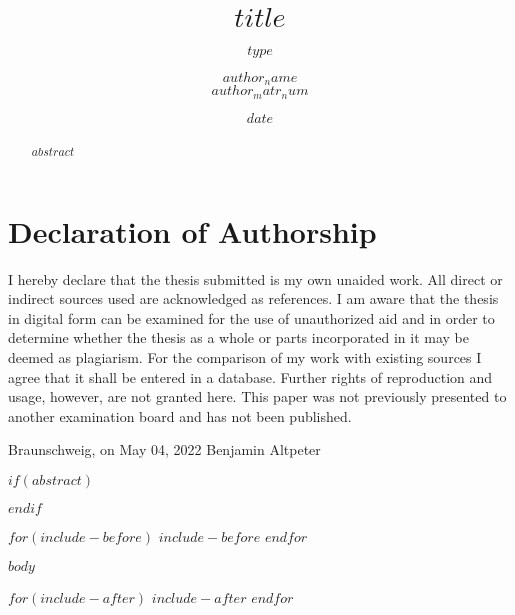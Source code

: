 \documentclass[
  a4paper,
  10pt,
  bibliography=totoc, %
  oneside,
  rgb,
  abstract=on,
  lnum, %
  smallchapters
]{tubsreprt}
\title{$title$}
\subtitle{$type$}
\author{$author_name$\\ \vspace{1cm} \large{$author_matr_num$}}
\date{$date$}
\renewcommand{\href}[2]{\originalHref{#1}{#2}\footnote{\url{#1}}}
\begin{document}
\maketitle

\chapter*{Declaration of Authorship}

\vspace{3cm}

I hereby declare that the thesis submitted is my own unaided work. All direct or indirect
sources used are acknowledged as references.
I am aware that the thesis in digital form can be examined for the use of unauthorized
aid and in order to determine whether the thesis as a whole or parts incorporated
in it may be deemed as plagiarism. For the comparison of my work with existing
sources I agree that it shall be entered in a database. Further rights
of reproduction and usage, however, are not granted here.
This paper was not previously presented to another examination board and has not
been published.
\vspace{3cm}

\hspace{2cm}Braunschweig, on May 04, 2022 \hfill Benjamin Altpeter\hspace{2cm}

\tableofcontents

$if(abstract)$
\begin{abstract}
    $abstract$

    \vspace*{\fill}
    \renewcommand{\href}[2]{\originalHref{#1}{#2}}
    \doclicenseThis
    \renewcommand{\href}[2]{\originalHref{#1}{#2}\footnote{\url{#1}}}
\end{abstract}


$endif$

$for(include-before)$
$include-before$
$endfor$

$body$

\printbibliography

$for(include-after)$
$include-after$
$endfor$
\end{document}
